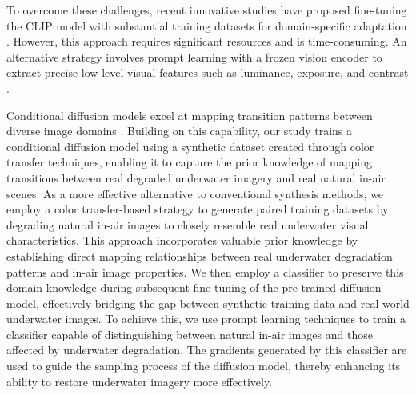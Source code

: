 \documentclass[3p,12pt,authoryear]{elsarticle}
\begin{document}
To overcome these challenges, recent innovative studies have proposed fine-tuning the CLIP model with substantial training datasets for domain-specific adaptation \cite{10.1145/3528223.3530164}. However, this approach requires significant resources and is time-consuming. An alternative strategy involves prompt learning with a frozen vision encoder to extract precise low-level visual features such as luminance, exposure, and contrast \cite{Liang2023IterativePL, 10.1007/s11263-022-01653-1}. 

Conditional diffusion models excel at mapping transition patterns between diverse image domains \cite{10377881}. Building on this capability, our study trains a conditional diffusion model using a synthetic dataset created through color transfer techniques, enabling it to capture the prior knowledge of mapping transitions between real degraded underwater imagery and real natural in-air scenes. As a more effective alternative to conventional synthesis methods, we employ a color transfer-based strategy \cite{946629} to generate paired training datasets by degrading natural in-air images to closely resemble real underwater visual characteristics. This approach incorporates valuable prior knowledge by establishing direct mapping relationships between real underwater degradation patterns and in-air image properties. We then employ a classifier to preserve this domain knowledge during subsequent fine-tuning of the pre-trained diffusion model, effectively bridging the gap between synthetic training data and real-world underwater images. To achieve this, we use prompt learning techniques to train a classifier capable of distinguishing between natural in-air images and those affected by underwater degradation. The gradients generated by this classifier are used to guide the sampling process of the diffusion model, thereby enhancing its ability to restore underwater imagery more effectively.
\end{document}
